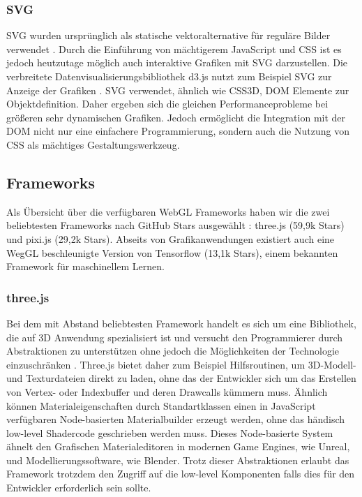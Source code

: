 \subsubsection*{\ac{SVG}}
\ac{SVG} wurden ursprünglich als statische vektoralternative für reguläre Bilder verwendet \cite{quint2003scalable}. Durch die Einführung von mächtigerem JavaScript und CSS ist es jedoch heutzutage möglich auch interaktive Grafiken mit SVG darzustellen. Die verbreitete Datenvisualisierungsbibliothek d3.js nutzt zum Beispiel SVG zur Anzeige der Grafiken \cite{d3info}. SVG verwendet, ähnlich wie CSS3D, \ac{DOM} Elemente zur Objektdefinition. Daher ergeben sich die gleichen Performanceprobleme bei größeren \bzw sehr dynamischen Grafiken. Jedoch ermöglicht die Integration mit der \ac{DOM} nicht nur eine einfachere Programmierung, sondern auch die Nutzung von CSS als mächtiges Gestaltungswerkzeug.
\subsection{Frameworks}
Als Übersicht über die verfügbaren WebGL Frameworks haben wir die zwei beliebtesten Frameworks nach GitHub Stars ausgewählt \cite{githubRanking}: three.js (59,9k Stars) und pixi.js (29,2k Stars). Abseits von Grafikanwendungen existiert auch eine WegGL beschleunigte Version von Tensorflow (13,1k Stars), einem bekannten Framework für maschinellem Lernen.
\subsubsection*{three.js} Bei dem mit Abstand beliebtesten Framework handelt es sich um eine Bibliothek, die auf 3D Anwendung spezialisiert ist und versucht den Programmierer durch Abstraktionen zu unterstützen ohne jedoch die Möglichkeiten der Technologie einzuschränken \cite{threejsGithub}. Three.js bietet daher zum Beispiel Hilfsroutinen, um 3D-Modell- und Texturdateien direkt zu laden, ohne das der Entwickler sich um das Erstellen von Vertex- oder Indexbuffer und deren Drawcalls kümmern muss. Ähnlich können Materialeigenschaften durch Standartklassen \bzw einen in JavaScript verfügbaren Node-basierten Materialbuilder erzeugt werden, ohne das händisch low-level Shadercode geschrieben werden muss. Dieses Node-basierte System ähnelt den Grafischen Materialeditoren in modernen Game Engines, wie \zb Unreal, und Modellierungssoftware, wie \zb Blender. Trotz dieser Abstraktionen erlaubt das Framework trotzdem den Zugriff auf die low-level Komponenten falls dies für den Entwickler erforderlich sein sollte.
